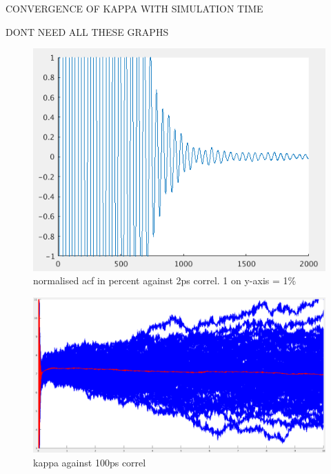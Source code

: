 \documentclass[%
preprint,                                  %
nofootinbib,
 amsmath,amssymb,
 aps,
]{revtex4-1}
\begin{document}

CONVERGENCE OF KAPPA WITH SIMULATION TIME

DONT NEED ALL THESE GRAPHS

\begin{figure}[h!]
  \includegraphics[width=\linewidth]{images/acf_decay_percent_correl.png}
  \caption{normalised acf in percent against 2ps correl. 1 on y-axis = 1\%}
  \label{fig:acf_decay}
\end{figure}

\begin{figure}[h!]
  \includegraphics[width=\linewidth]{images/4x4x3_01-z-ints.png}
  \caption{kappa against 100ps correl}
  \label{fig:int_drift}
\end{figure}
\end{document}
